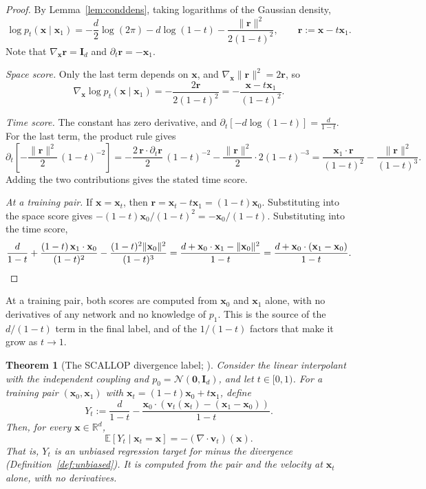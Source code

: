 \documentclass[11pt,a4paper]{article}
\numberwithin{equation}{section}     %
\theoremstyle{plain}        %
\newtheorem{theorem}{Theorem}[section]
\theoremstyle{definition}   %
\theoremstyle{remark}       %
\begin{document}
\begin{proof}
By Lemma~\ref{lem:conddens}, taking logarithms of the Gaussian density,
\[
\log p_t(\mathbf{x}\mid\mathbf{x}_1)=-\frac{d}{2}\log(2\pi)-d\log(1-t)-\frac{\|\mathbf{r}\|^2}{2(1-t)^2},\qquad\mathbf{r}:=\mathbf{x}-t\mathbf{x}_1 .
\]
Note that $\nabla_{\mathbf{x}}\mathbf{r}=\mathbf{I}_d$ and $\partial_t\mathbf{r}=-\mathbf{x}_1$.

\emph{Space score.} Only the last term depends on $\mathbf{x}$, and $\nabla_{\mathbf{x}}\|\mathbf{r}\|^2=2\mathbf{r}$, so
\[
\nabla_{\mathbf{x}}\log p_t(\mathbf{x}\mid\mathbf{x}_1)=-\frac{2\mathbf{r}}{2(1-t)^2}=-\frac{\mathbf{x}-t\mathbf{x}_1}{(1-t)^2}.
\]

\emph{Time score.} The constant has zero derivative, and $\partial_t\left[-d\log(1-t)\right]=\frac{d}{1-t}$. For the last term, the product rule gives
\[
\partial_t\left[-\frac{\|\mathbf{r}\|^2}{2}\,(1-t)^{-2}\right]
=-\frac{2\,\mathbf{r}\cdot\partial_t\mathbf{r}}{2}\,(1-t)^{-2}-\frac{\|\mathbf{r}\|^2}{2}\cdot2(1-t)^{-3}
=\frac{\mathbf{x}_1\cdot\mathbf{r}}{(1-t)^2}-\frac{\|\mathbf{r}\|^2}{(1-t)^3}.
\]
Adding the two contributions gives the stated time score.

\emph{At a training pair.} If $\mathbf{x}=\mathbf{x}_t$, then $\mathbf{r}=\mathbf{x}_t-t\mathbf{x}_1=(1-t)\mathbf{x}_0$. Substituting into the space score gives $-(1-t)\mathbf{x}_0/(1-t)^2=-\mathbf{x}_0/(1-t)$. Substituting into the time score,
\[
\frac{d}{1-t}+\frac{(1-t)\,\mathbf{x}_1\cdot\mathbf{x}_0}{(1-t)^2}-\frac{(1-t)^2\|\mathbf{x}_0\|^2}{(1-t)^3}
=\frac{d+\mathbf{x}_0\cdot\mathbf{x}_1-\|\mathbf{x}_0\|^2}{1-t}
=\frac{d+\mathbf{x}_0\cdot(\mathbf{x}_1-\mathbf{x}_0)}{1-t}. \qedhere
\]
\end{proof}

At a training pair, both scores are computed from $\mathbf{x}_0$ and $\mathbf{x}_1$ alone, with no derivatives of any network and no knowledge of $p_1$. This is the source of the $d/(1-t)$ term in the final label, and of the $1/(1-t)$ factors that make it grow as $t\to1$.

\begin{theorem}[The SCALLOP divergence label; \citealp{ouyang2026}]\label{thm:scallop}
Consider the linear interpolant with the independent coupling and $p_0=\mathcal{N}(\mathbf{0},\mathbf{I}_d)$, and let $t\in[0,1)$. For a training pair $(\mathbf{x}_0,\mathbf{x}_1)$ with $\mathbf{x}_t=(1-t)\mathbf{x}_0+t\mathbf{x}_1$, define
\[
Y_t:=\frac{d}{1-t}-\frac{\mathbf{x}_0\cdot\left(\mathbf{v}_t(\mathbf{x}_t)-(\mathbf{x}_1-\mathbf{x}_0)\right)}{1-t}.
\]
Then, for every $\mathbf{x}\in\mathbb{R}^d$,
\[
\mathbb{E}\left[Y_t\mid\mathbf{x}_t=\mathbf{x}\right]=-\left(\nabla\cdot\mathbf{v}_t\right)(\mathbf{x}).
\]
That is, $Y_t$ is an unbiased regression target for minus the divergence (Definition~\ref{def:unbiased}). It is computed from the pair and the velocity at $\mathbf{x}_t$ alone, with no derivatives.
\end{theorem}
\end{document}
